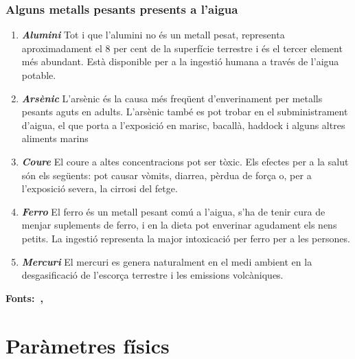 \subsubsection{Alguns metalls pesants presents a l'aigua}
\begin{enumerate}
 \item \textit{\textbf{Alumini}}
 Tot i que l'alumini no és un metall pesat, representa aproximadament el 8 per cent de la superfície terrestre i és el tercer element més abundant. Està disponible per a la ingestió humana a través de l'aigua potable.
 \item \textit{\textbf{Arsènic}}
 L'arsènic és la causa més freqüent d'enverinament per metalls pesants aguts en adults. L'arsènic també es pot trobar en el subministrament d'aigua, el que porta a l'exposició en marisc, bacallà, haddock i alguns altres aliments marins
 \item \textit{\textbf{Coure}}
 El coure a altes concentracions pot ser tòxic. Els efectes per a la salut són els següents: pot causar vòmits, diarrea, pèrdua de força o, per a l'exposició severa, la cirrosi del fetge.
 \item \textit{\textbf{Ferro}}
 El ferro és un metall pesant comú a l'aigua, s'ha de tenir cura de menjar suplements de ferro, i en la dieta pot enverinar agudament els nens petits. La ingestió representa la major intoxicació per ferro per a les persones.
 \item \textit{\textbf{Mercuri}}
 El mercuri es genera naturalment en el medi ambient en la desgasificació de l'escorça terrestre i les emissions volcàniques.
\end{enumerate}
\textbf{Fonts:~\cite{WikiMetales},~\cite{carbotecnia}}
\section{Paràmetres físics} \label{sec:pf}

